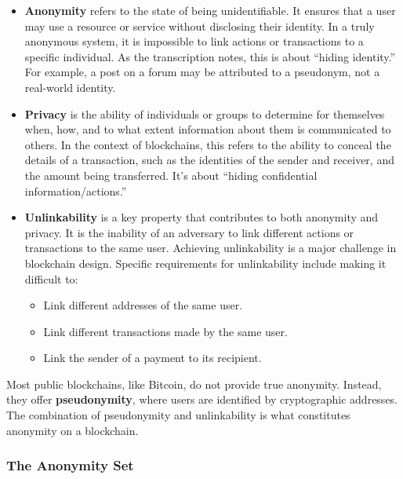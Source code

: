 \begin{itemize}
\item
  \textbf{Anonymity} refers to the state of being unidentifiable. It
  ensures that a user may use a resource or service without disclosing
  their identity. In a truly anonymous system, it is impossible to link
  actions or transactions to a specific individual. As the transcription
  notes, this is about ``hiding identity.'' For example, a post on a
  forum may be attributed to a pseudonym, not a real-world identity.
\item
  \textbf{Privacy} is the ability of individuals or groups to determine
  for themselves when, how, and to what extent information about them is
  communicated to others. In the context of blockchains, this refers to
  the ability to conceal the details of a transaction, such as the
  identities of the sender and receiver, and the amount being
  transferred. It's about ``hiding confidential information/actions.''
\item
  \textbf{Unlinkability} is a key property that contributes to both
  anonymity and privacy. It is the inability of an adversary to link
  different actions or transactions to the same user. Achieving
  unlinkability is a major challenge in blockchain design. Specific
  requirements for unlinkability include making it difficult to:

  \begin{itemize}
  \tightlist
  \item
    Link different addresses of the same user.
  \item
    Link different transactions made by the same user.
  \item
    Link the sender of a payment to its recipient.
  \end{itemize}
\end{itemize}

Most public blockchains, like Bitcoin, do not provide true anonymity.
Instead, they offer \textbf{pseudonymity}, where users are identified by
cryptographic addresses. The combination of pseudonymity and
unlinkability is what constitutes anonymity on a blockchain.


\subsubsection{The Anonymity Set}\label{the-anonymity-set}

